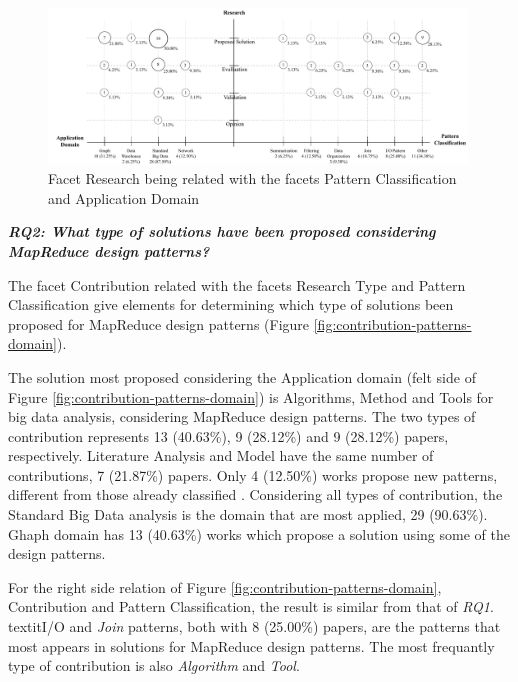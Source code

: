 \begin{figure}[hbtp]
\centering
\includegraphics[width=0.99\textwidth]{figs/Research-Patterns-Domain.pdf}
\caption{Facet Research being related with the facets Pattern
Classification and Application Domain}
\label{fig:research-patterns-domain}
\end{figure}

  
\bigskip
\textbf{\textit{RQ2: What type of solutions have been proposed considering
MapReduce design patterns?}}

The facet Contribution related with the facets Research Type and Pattern
Classification give elements for determining which type of solutions been
proposed for MapReduce design patterns (Figure
\ref{fig:contribution-patterns-domain}).

The solution most proposed considering the Application domain (felt side of
Figure \ref{fig:contribution-patterns-domain}) is Algorithms, Method and Tools
for big data analysis, considering MapReduce design patterns. The two types of
contribution represents 13 (40.63\%), 9 (28.12\%) and 9 (28.12\%) papers,
respectively. Literature Analysis and Model have the same number of
contributions, 7 (21.87\%) papers. Only 4 (12.50\%) works propose new patterns,
different from those already classified
\cite{White:2012,pig-designpattern:2014}. Considering all types of contribution,
the Standard Big Data analysis is the domain that are most applied, 29
(90.63\%). Ghaph domain has 13 (40.63\%) works which propose a solution using
some of the design patterns.

For the right side relation of Figure \ref{fig:contribution-patterns-domain},
Contribution and Pattern Classification, the result is similar from that of
\textit{RQ1}. textit{I/O} and \textit{Join} patterns, both with 8 (25.00\%)
papers, are the patterns that most appears in solutions for MapReduce design
patterns. The most frequantly type of contribution is also \textit{Algorithm}
and \textit{Tool}.

